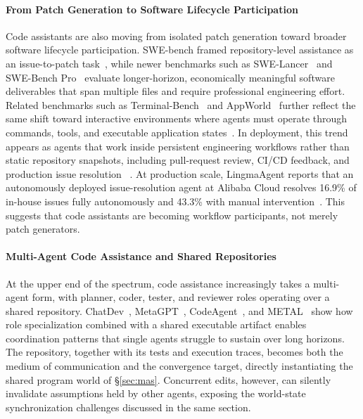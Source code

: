 \documentclass{llmxive}
\begin{document}
\paragraph{From Patch Generation to Software Lifecycle Participation}
Code assistants are also moving from isolated patch generation toward broader
software lifecycle participation. SWE-bench framed repository-level assistance
as an issue-to-patch task~\citep{jimenez2023swe}, while newer benchmarks such as
SWE-Lancer~\citep{miserendino2025swe} and SWE-Bench Pro~\citep{deng2025swe} evaluate longer-horizon, economically meaningful
software deliverables that span multiple files and require professional
engineering effort. Related benchmarks
such as Terminal-Bench~\citep{merrill2026terminal} and AppWorld~\citep{trivedi2024appworld} further reflect the same shift toward
interactive environments where agents must operate through commands, tools, and
executable application states~\citep{xie2024osworld,yao2025taubench}. In deployment, this trend appears as agents that work
inside persistent engineering workflows rather than static repository snapshots,
including pull-request review, CI/CD feedback, and production issue resolution
~\citep{tang2024codeagent,Baqar_2025}. At production scale,
LingmaAgent reports that an autonomously deployed issue-resolution agent at
Alibaba Cloud resolves 16.9\% of in-house issues fully autonomously and 43.3\%
with manual intervention~\citep{ma2025alibaba,li2026advances}. This suggests
that code assistants are becoming workflow participants, not merely patch
generators.

\paragraph{Multi-Agent Code Assistance and Shared Repositories}
At the upper end of the spectrum, code assistance increasingly takes a multi-agent form, with planner, coder, tester, and reviewer roles operating over a shared repository.
ChatDev~\cite{Qian2023ChatDev}, MetaGPT~\cite{Hong2023MetaGPT},
CodeAgent~\cite{zhang2024codeagent}, and METAL~\cite{li2025metal} show how role specialization combined with a shared executable artifact enables coordination patterns that single agents struggle to sustain over long horizons.
The repository, together with its tests and execution traces, becomes both the medium of communication and the convergence target, directly instantiating the shared program world of \S\ref{sec:mas}.
Concurrent edits, however, can silently invalidate assumptions held by other agents, exposing the world-state synchronization challenges discussed in the same section.
\end{document}
